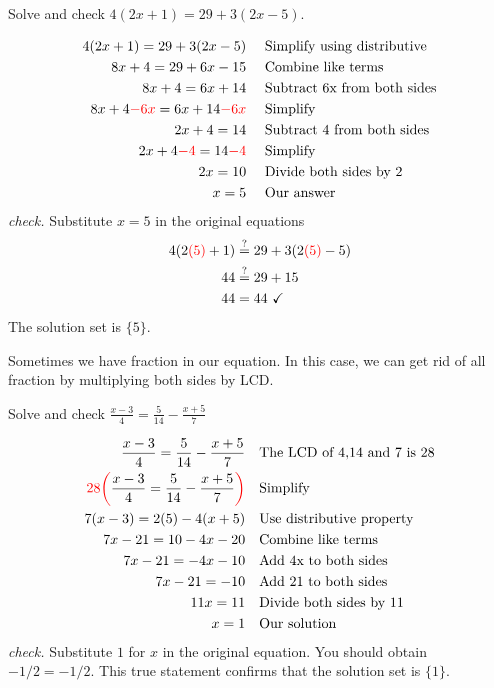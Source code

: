 \vspace{0.4cm}
\begin{exa}
    Solve and check $4(2x+1) =29+3(2x-5)$.
\end{exa}
\begin{align*}
    4(2x+1) = 29 + 3(2x-5)& &   &\text{Simplify using distributive}\\
    8x+4 = 29 + 6x-15&  &   &\text{Combine like terms}\\
    8x+4 = 6x+14&   &   &\text{Subtract 6x from both sides}\\
    8x+4\textcolor{red}{-6x}=6x+14\textcolor{red}{-6x}& &\
    &\text{Simplify}\\
    2x+4 = 14&  &&\text{Subtract 4 from both sides}\\
    2x+4\textcolor{red}{-4}=14\textcolor{red}{-4}&    &&\text{Simplify}\\
    2x = 10&    &   &\text{Divide both sides by 2}\\
    x = 5&  &   &\text{Our answer}
\end{align*}
\textit{check.} Substitute $x=5$ in the original equations
\begin{align*}
    4(2\textcolor{red}{(5)}+1) &\stackrel{?}{=} 29 + 3(2\textcolor{red}{(5)}-5) \\
    44 & \stackrel{?}{=} 29+15 \\
    44 &= 44\ \checkmark
\end{align*}
The solution set is $\{5\}$.
\begin{nt}
    Sometimes we have fraction in our equation. In this case, we can get rid of all fraction by multiplying both sides by LCD.
\end{nt}
\begin{exa}
    Solve and check $\displaystyle \frac{x-3}{4}=\frac{5}{14}-\frac{x+5}{7}$
\end{exa}
\begin{align*}
    \frac{x-3}{4}=\frac{5}{14}-\frac{x+5}{7}&   &&\text{The LCD of 4,14 and 7 is 28}\\
    \textcolor{red}{28\biggl(}\frac{x-3}{4}=\frac{5}{14}-\frac{x+5}{7}\textcolor{red}{\biggr)}& &
    &\text{Simplify}\\
    7(x-3) = 2(5) -4(x+5)& &&\text{Use distributive property}\\
    7x-21 = 10-4x-20&    &&\text{Combine like terms}\\
    7x-21 = -4x-10&  &&\text{Add 4x to both sides}\\
    7x-21 = -10 &    &&\text{Add 21 to both sides}\\
    11x = 11&   &&\text{Divide both sides by 11}\\
    x = 1&  &   &\text{Our solution}
\end{align*}
\textit{check.} Substitute $1$ for $x$ in the original
equation. You should obtain $-1/2=-1/2$. This true statement confirms that the solution set is $\{1\}$.
